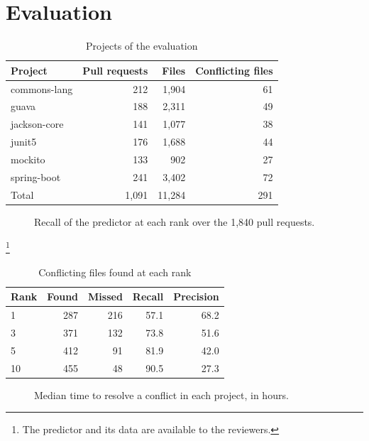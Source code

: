 \section{Evaluation}
\begin{table}[t]
\caption{\sizeofcaptions Projects of the evaluation}
\label{tab:projects}
\centering
\sizeoftables
\begin{tabular}{lrrr}
\toprule
Project & Pull requests & Files & Conflicting files \\
\midrule
commons-lang & 212 & 1,904 & 61 \\
guava & 188 & 2,311 & 49 \\
jackson-core & 141 & 1,077 & 38 \\
junit5 & 176 & 1,688 & 44 \\
mockito & 133 & 902 & 27 \\
spring-boot & 241 & 3,402 & 72 \\
\midrule
Total & 1,091 & 11,284 & 291 \\
\bottomrule
\end{tabular}
\end{table}
\begin{figure}[t]
\centering
{}
\caption{\sizeofcaptions Recall of the predictor at each rank over the 1,840 pull requests.}
\label{fig:recall}
\end{figure}
\lipsum[26-30]\footnote{The predictor and its data are available to the reviewers.}
\begin{table}[t]
\caption{\sizeofcaptions Conflicting files found at each rank}
\label{tab:recall}
\centering
\sizeoftables
\begin{tabular}{lrrrr}
\toprule
Rank & Found & Missed & Recall & Precision \\
\midrule
1 & 287 & 216 & 57.1 & 68.2 \\
3 & 371 & 132 & 73.8 & 51.6 \\
5 & 412 & 91 & 81.9 & 42.0 \\
10 & 455 & 48 & 90.5 & 27.3 \\
\bottomrule
\end{tabular}
\end{table}
\begin{figure}[t]
\centering
{}
\caption{\sizeofcaptions Median time to resolve a conflict in each project, in hours.}
\label{fig:time}
\end{figure}
\lipsum[31-36]

